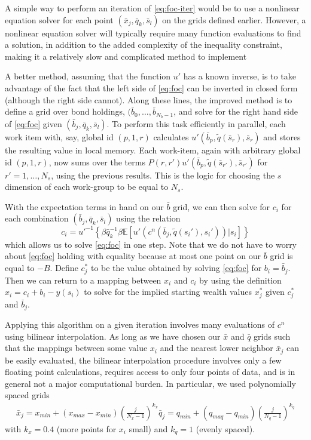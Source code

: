 \documentclass[a4paper,12pt]{article}
\newcommand{\E}{\mathbb{E}}
\numberwithin{equation}{section}
\theoremstyle{definition}
\begin{document}
A simple way to perform an iteration of \eqref{eq:foc-iter} would be to
use a nonlinear equation solver for each point $(\bar{x}_j, \bar{q}_k,
\bar{s}_l)$ on the grids defined earlier. However, a nonlinear
equation solver will typically require many function evaluations to
find a solution, in addition to the added complexity of the inequality
constraint, making it a relatively slow and complicated method to
implement

A better method, assuming that the function $u'$ has a known inverse,
is to take advantage of the fact that the left side of \eqref{eq:foc} can
be inverted in closed form (although the right side cannot). Along
these lines, the improved method is to define a grid over bond
holdings, $(\bar{b}_0, \ldots, \bar{b}_{N_b-1}$, and solve for the
right hand side of \eqref{eq:foc} given $(\bar{b}_j, \bar{q}_k,
\bar{s}_l)$. To perform this task efficiently in parallel, each work
item with, say, global id $(p, 1, r)$ calculates $u'(\bar{b}_p,
\tilde{q}(\bar{s}_r), \bar{s}_r)$ and stores the resulting value in
local memory. Each work-item, again with arbitrary global id $(p, 1,
r)$, now sums over the terms $P(r, r') u'(\bar{b}_p,
\tilde{q}(\bar{s}_{r'}), \bar{s}_{r'})$ for $r' = 1, \ldots, N_s$,
using the previous results. This is the logic for choosing the $s$
dimension of each work-group to be equal to $N_s$.

With the expectation terms in hand on our $\bar{b}$ grid, we can then
solve for $c_i$ for each combination $(\bar{b}_j, \bar{q}_k,
\bar{s}_l)$ using the relation
\begin{equation*}
  c_i = u'^{-1} \left\{ \beta \bar{q}_k^{-1} \beta \E \left[ u'(c^n(\bar{b}_j, \tilde{q}(s_i'), s_i')) \Bigr| s_i \right] \right\}
\end{equation*}
which allows us to solve \eqref{eq:foc} in one step. Note that we do not
have to worry about \eqref{eq:foc} holding with equality because at most
one point on our $\bar{b}$ grid is equal to $-B$. Define $c_j^*$ to be
the value obtained by solving \eqref{eq:foc} for $b_i = \bar{b}_j$. Then
we can return to a mapping between $x_i$ and $c_i$ by using the
definition $x_i = c_i + b_i - y(s_i)$ to solve for the implied
starting wealth values $x_j^*$ given $c_j^*$ and $\bar{b}_j$.

Applying this algorithm on a given iteration involves many evaluations
of $c^n$ using bilinear interpolation. As long as we have chosen our
$\bar{x}$ and $\bar{q}$ grids such that the mappings between some
value $x_i$ and the nearest lower neighbor $\bar{x}_j$ can be easily
evaluated, the bilinear interpolation procedure involves only a few
floating point calculations, requires access to only four points of
data, and is in general not a major computational burden. In
particular, we used polynomially spaced grids
\begin{align*}
  \bar{x}_j = x_{min} + (x_{max} - x_{min}) \left( \frac{j}{N_x-1} \right)^{k_x}
  \bar{q}_j = q_{min} + (q_{maq} - q_{min}) \left( \frac{j}{N_q-1} \right)^{k_q}
\end{align*}
with $k_x = 0.4$ (more points for $x_i$ small) and $k_q = 1$ (evenly
spaced).
\end{document}
